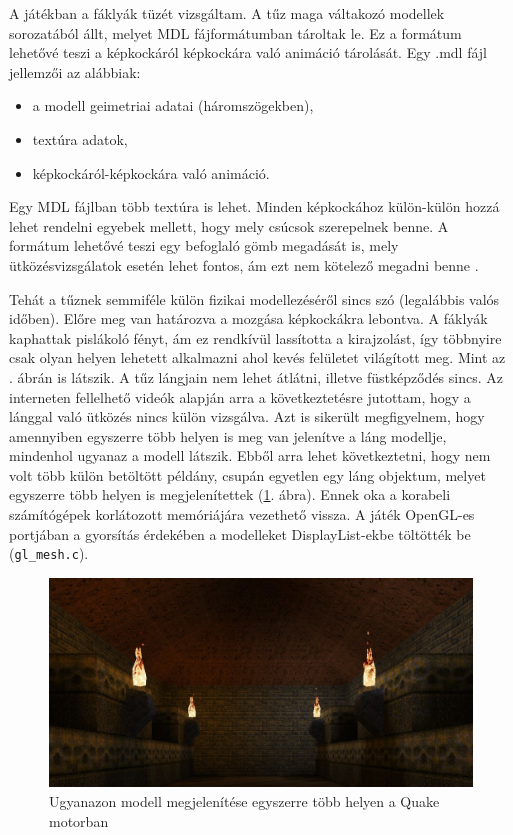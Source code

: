 A játékban a fáklyák tüzét vizsgáltam. A tűz maga váltakozó modellek sorozatából állt, melyet MDL fájformátumban tároltak le. Ez a formátum lehetővé teszi a képkockáról képkockára való animáció tárolását. Egy .mdl fájl jellemzői az alábbiak:
\begin{itemize} 
\item a modell geimetriai adatai (háromszögekben),
\item textúra adatok,
\item képkockáról-képkockára való animáció.
\end{itemize} 
Egy MDL fájlban több textúra is lehet. Minden képkockához külön-külön hozzá lehet rendelni egyebek mellett, hogy mely csúcsok szerepelnek benne. A formátum lehetővé teszi egy befoglaló gömb megadását is, mely ütközésvizsgálatok esetén lehet fontos, ám ezt nem kötelező megadni benne \cite{MDLformat}. 


Tehát a tűznek semmiféle külön fizikai modellezéséről sincs szó (legalábbis valós időben). Előre meg van határozva a mozgása képkockákra lebontva. A fáklyák kaphattak pislákoló fényt, ám ez rendkívül lassította a kirajzolást, így többnyire csak olyan helyen lehetett alkalmazni ahol kevés felületet világított meg. Mint az . ábrán is látszik. A tűz lángjain nem lehet átlátni, illetve füstképződés sincs. Az interneten fellelhető videók alapján arra a következtetésre jutottam, hogy a lánggal való ütközés nincs külön vizsgálva. Azt is sikerült megfigyelnem, hogy amennyiben egyszerre több helyen is meg van jelenítve a láng modellje, mindenhol ugyanaz a modell látszik. Ebből arra lehet következtetni, hogy nem volt több külön betöltött példány, csupán egyetlen egy láng objektum, melyet egyszerre több helyen is megjelenítettek (\ref{fig:quakeTorch}. ábra). Ennek oka a korabeli számítógépek korlátozott memóriájára vezethető vissza. A játék OpenGL-es portjában a gyorsítás érdekében a modelleket DisplayList-ekbe töltötték be (\texttt{gl\_mesh.c}).

\begin{figure}[h]
\centering
\includegraphics[width=\textwidth]{kepek/quake_torches2.jpg}
\caption{Ugyanazon modell megjelenítése egyszerre több helyen a Quake motorban}
\label{fig:quakeTorch}
\end{figure}

